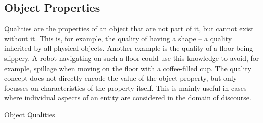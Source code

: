\subsection{Object Properties}
\label{sec:qualification}

Qualities are the properties of an object that are not part of it, but cannot exist without it.
This is, for example, the quality of having a shape -- a quality inherited by all physical objects.
Another example is the quality of a floor being slippery.
A robot navigating on such a floor could use this knowledge to avoid, for example,
spillage when moving on the floor with a coffee-filled cup.
The quality concept does not directly encode the value of the object property, but only focusses on characteristics of the property itself.
This is mainly useful in cases where individual aspects of an entity are considered in the domain of discourse.

\begin{ODP}{Object Qualities}
\end{ODP}

